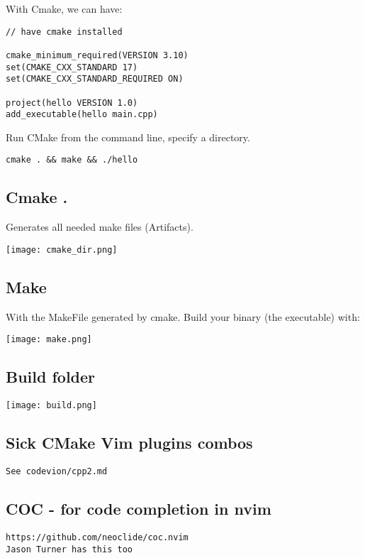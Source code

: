 With Cmake, we can have:

\begin{verbatim}
// have cmake installed

cmake_minimum_required(VERSION 3.10)
set(CMAKE_CXX_STANDARD 17)
set(CMAKE_CXX_STANDARD_REQUIRED ON)

project(hello VERSION 1.0)
add_executable(hello main.cpp)
\end{verbatim}

Run CMake from the command line, specify a directory.
\begin{verbatim}
cmake . && make && ./hello
\end{verbatim}

\subsection{Cmake .  }

Generates all needed make files (Artifacts).

\begin{center}
    \texttt{[image: cmake\_dir.png]}
\end{center}

\subsection{Make}

With the MakeFile generated by cmake. Build your binary (the executable) with:

\begin{center}
    \texttt{[image: make.png]}
\end{center}

\subsection{Build folder}

\begin{center}
    \texttt{[image: build.png]}
\end{center}

\subsection{Sick CMake Vim plugins combos}

\begin{verbatim}
See codevion/cpp2.md
\end{verbatim}

\subsection{COC - for code completion in nvim}
\begin{verbatim}
https://github.com/neoclide/coc.nvim
Jason Turner has this too
\end{verbatim}

